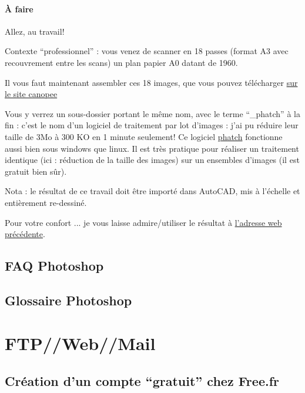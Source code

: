 \documentclass[a4paper,12pt,french]{sphinxmanual}
\begin{document}
\subsubsection{À faire}
\label{psd/scan+assemblage_psd+gimp+autopano:a-faire}
Allez, au travail!

Contexte ``professionnel'' : vous venez de scanner en 18 passes (format A3 avec recouvrement entre les scans) un plan papier A0 datant de 1960.

Il vous faut maintenant assembler ces 18 images, que vous pouvez télécharger \href{http://www.canopee.org/fichiers/teb-d/images/panoramas/scans\_plan-papier-A0\_maison-Turlier/}{sur le site canopee}

Vous y verrez un sous-dossier portant le même nom, avec le terme ``\_phatch'' à la fin : c'est le nom d'un logiciel de traitement par lot d'images : j'ai pu réduire leur taille de 3Mo à 300 KO en 1 minute seulement! Ce logiciel \href{http://photobatch.stani.be/}{phatch} fonctionne aussi bien sous windows que linux. Il est très pratique pour réaliser un traitement identique (ici : réduction de la taille des images) sur un ensembles d'images (il est gratuit bien sûr).

Nota : le résultat de ce travail doit être importé dans AutoCAD, mis à l'échelle et entièrement re-dessiné.

Pour votre confort ... je vous laisse admire/utiliser le résultat à \href{http://www.canopee.org/fichiers/teb-d/images/panoramas/scans\_plan-papier-A0\_maison-Turlier/}{l'adresse web précédente}.


\section{FAQ Photoshop}
\label{psd/faq_psd:faq-photoshop}\label{psd/faq_psd::doc}

\section{Glossaire Photoshop}
\label{psd/glossaire_psd::doc}\label{psd/glossaire_psd:glossaire-photoshop}

\chapter{FTP//Web//Mail}
\label{ftpwebmail/index:index-ftpwebmail}\label{ftpwebmail/index::doc}\label{ftpwebmail/index:ftp-web-mail}

\section{Création d'un compte ``gratuit'' chez Free.fr}
\label{ftpwebmail/compte-free:creation-d-un-compte-gratuit-chez-free-fr}\label{ftpwebmail/compte-free::doc}
\end{document}
